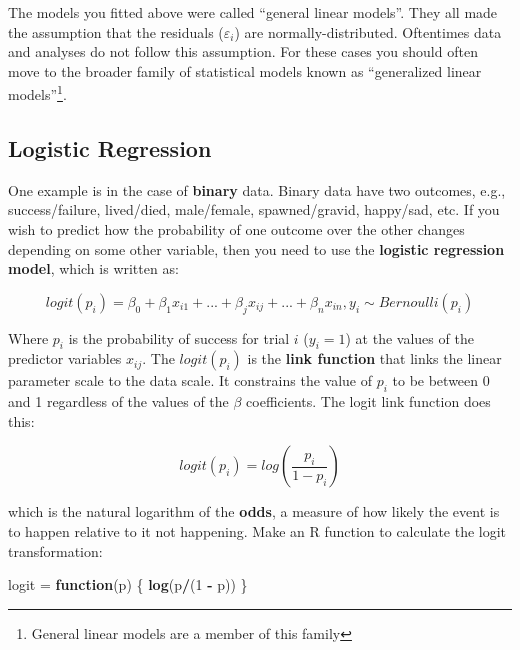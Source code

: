 \documentclass[]{book}
\newenvironment{Shaded}{\begin{snugshade}}{\end{snugshade}}
\newcommand{\KeywordTok}[1]{\textcolor[rgb]{0.13,0.29,0.53}{\textbf{#1}}}
\newcommand{\DecValTok}[1]{\textcolor[rgb]{0.00,0.00,0.81}{#1}}
\newcommand{\StringTok}[1]{\textcolor[rgb]{0.31,0.60,0.02}{#1}}
\newcommand{\ControlFlowTok}[1]{\textcolor[rgb]{0.13,0.29,0.53}{\textbf{#1}}}
\newcommand{\OperatorTok}[1]{\textcolor[rgb]{0.81,0.36,0.00}{\textbf{#1}}}
\newcommand{\NormalTok}[1]{#1}
\let\rmarkdownfootnote\footnote%
\def\footnote{\protect\rmarkdownfootnote}
\theoremstyle{definition}
\theoremstyle{definition}
\theoremstyle{definition}
\theoremstyle{remark}
\begin{document}
The models you fitted above were called ``general linear models''. They
all made the assumption that the residuals (\(\varepsilon_i\)) are
normally-distributed. Oftentimes data and analyses do not follow this
assumption. For these cases you should often move to the broader family
of statistical models known as ``generalized linear models''\footnote{General
  linear models are a member of this family}.

\subsection{Logistic Regression}\label{logis-regression}

One example is in the case of \textbf{binary} data. Binary data have two
outcomes, e.g., success/failure, lived/died, male/female,
spawned/gravid, happy/sad, etc. If you wish to predict how the
probability of one outcome over the other changes depending on some
other variable, then you need to use the \textbf{logistic regression
model}, which is written as:

\begin{equation}
  logit(p_i)=\beta_0 + \beta_1 x_{i1} + ... + \beta_j x_{ij}+ ... + \beta_n x_{in}, y_i \sim Bernoulli(p_i)
\label{eq:logis-reg}
\end{equation}

Where \(p_i\) is the probability of success for trial \(i\)
(\(y_i = 1\)) at the values of the predictor variables \(x_{ij}\). The
\(logit(p_i)\) is the \textbf{link function} that links the linear
parameter scale to the data scale. It constrains the value of \(p_i\) to
be between 0 and 1 regardless of the values of the \(\beta\)
coefficients. The logit link function does this:

\begin{equation}
  logit(p_i) = log\left(\frac{p_i}{1-p_i}\right)
\label{eq:logit}
\end{equation}

which is the natural logarithm of the \textbf{odds}, a measure of how
likely the event is to happen relative to it not happening. Make an R
function to calculate the logit transformation:

\begin{Shaded}
\begin{Highlighting}[]
\NormalTok{logit =}\StringTok{ }\ControlFlowTok{function}\NormalTok{(p) \{}
  \KeywordTok{log}\NormalTok{(p}\OperatorTok{/}\NormalTok{(}\DecValTok{1} \OperatorTok{-}\StringTok{ }\NormalTok{p))}
\NormalTok{\}}
\end{Highlighting}
\end{Shaded}
\end{document}
